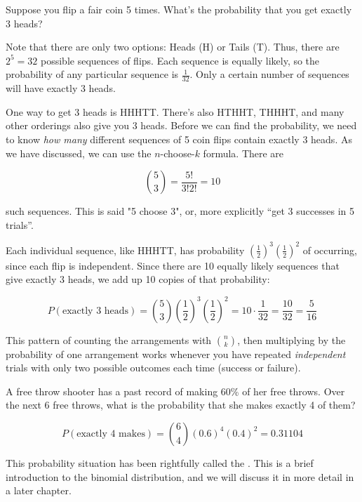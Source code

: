 Suppose you flip a fair coin 5 times. What's the probability that you get exactly 3 heads? 

Note that there are only two options: Heads (H) or Tails (T). Thus, there are $2^5 = 32$ possible sequences of flips. Each sequence is equally likely, so the probability of any particular sequence is $\frac{1}{32}$. Only a certain number of sequences will have exactly 3 heads.

One way to get 3 heads is HHHTT. There's also HTHHT, THHHT, and many other orderings also give you 3 heads. Before we can find the probability, we need to know \textit{how many} different sequences of 5 coin flips contain exactly 3 heads. As we have discussed, we can use the $n$-choose-$k$ formula. There are

$$\binom{5}{3} = \frac{5!}{3!2!} = 10$$

such sequences. This is said "5 choose 3", or, more explicitly ``get 3 successes in 5 trials''. 

Each individual sequence, like HHHTT, has probability $\left(\frac{1}{2}\right)^3\left(\frac{1}{2}\right)^2$ of occurring, since each flip is independent. Since there are 10 equally likely sequences that give exactly 3 heads, we add up 10 copies of that probability:

$$P(\text{exactly 3 heads}) = \binom{5}{3}\left(\frac{1}{2}\right)^3\left(\frac{1}{2}\right)^2 = 10 \cdot \frac{1}{32} = \frac{10}{32} = \frac{5}{16}$$

This pattern of counting the arrangements with $\binom{n}{k}$, then multiplying by the probability of one arrangement works whenever you have repeated \emph{independent} trials with only two possible outcomes each time (success or failure). 

\begin{Exercise}[title={Free Throws}, label={ex:free_throw_prob}]
A free throw shooter has a past record of making 60\% of her free throws. Over the next 6 free throws, what is the probability that she makes exactly 4 of them?
\end{Exercise}


\begin{Answer}[ref={ex:free_throw_prob}]

\[
P(\text{exactly 4 makes}) = \binom{6}{4}(0.6)^4(0.4)^2 = 0.31104
\]

\end{Answer}
This probability situation has been rightfully called the . This is a brief introduction to the binomial distribution, and we will discuss it in more detail in a later chapter.
